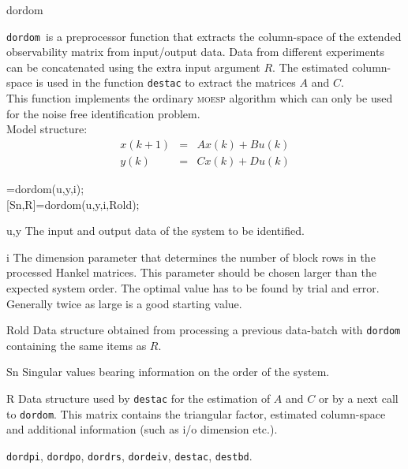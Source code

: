 \documentclass{book}
\newcommand{\moesp}{\textsc{moesp}}
\newcommand{\destbd}{\texttt{destbd}}
\newcommand{\dordom}{\texttt{dordom}}
\newcommand{\dordpo}{\texttt{dordpo}}
\newcommand{\dordpi}{\texttt{dordpi}}
\newcommand{\dordrs}{\texttt{dordrs}}
\newcommand{\dordeiv}{\texttt{dordeiv}}
\newcommand{\destac}{\texttt{destac}}
\begin{document}
\begin{command}{dordom}
\begin{purpose}
  \dordom\ is a preprocessor function that extracts the column-space of
  the extended observability matrix from input/output data. Data from
  different experiments can be concatenated using the extra input
  argument $R$. The estimated column-space is used in the function {\destac} 
  to extract the matrices $A$ and $C$.\\ This function implements the
  ordinary {\moesp} algorithm which can only be used for the noise free
  identification problem.\\
 Model structure:
  \begin{eqnarray*}
    x(k+1) &=& Ax(k) + Bu(k)\\
    y(k)   &=& Cx(k) + Du(k)
  \end{eqnarray*}
\end{purpose}

\begin{syntax}
[Sn,R]=dordom(u,y,i);\\[0pt]
[Sn,R]=dordom(u,y,i,Rold);
\end{syntax}

\begin{inputs}
\item[u,y] The input and output data of the system to be identified.
\item[i] The dimension parameter that determines the number of block
  rows in the processed Hankel matrices. This parameter should be
  chosen larger than the expected system order. The optimal value has
  to be found by trial and error. Generally twice as large is a good
  starting value.
\item[Rold] Data structure obtained from processing a previous
  data-batch with {\dordom} containing the same items as $R$.
\end{inputs}

\begin{outputs}
\item[Sn] Singular values bearing information on the order of the
  system.
\item[R] Data structure used by {\destac} for the estimation of $A$
  and $C$ or by a next call to {\dordom}. This matrix contains the
  triangular factor, estimated column-space and additional information
  (such as i/o dimension etc.).
\end{outputs}

\begin{seealso}
\dordpi, \dordpo, \dordrs, \dordeiv, \destac, \destbd.
\end{seealso}
\end{command}%
\end{document}
